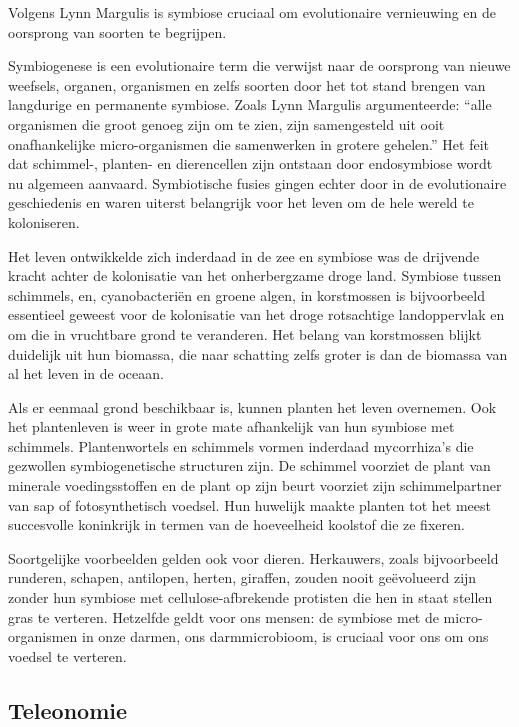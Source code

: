 \documentclass[
  11pt,
]{book}
\begin{document}
Volgens Lynn Margulis is symbiose cruciaal om evolutionaire vernieuwing en de oorsprong van soorten te begrijpen.

Symbiogenese is een evolutionaire term die verwijst naar de oorsprong van nieuwe weefsels, organen, organismen en zelfs soorten door het tot stand brengen van langdurige en permanente symbiose. Zoals Lynn Margulis argumenteerde: ``alle organismen die groot genoeg zijn om te zien, zijn samengesteld uit ooit onafhankelijke micro-organismen die samenwerken in grotere gehelen.'' Het feit dat schimmel-, planten- en dierencellen zijn ontstaan door endosymbiose wordt nu algemeen aanvaard. Symbiotische fusies gingen echter door in de evolutionaire geschiedenis en waren uiterst belangrijk voor het leven om de hele wereld te koloniseren.

Het leven ontwikkelde zich inderdaad in de zee en symbiose was de drijvende kracht achter de kolonisatie van het onherbergzame droge land. Symbiose tussen schimmels, en, cyanobacteriën en groene algen, in korstmossen is bijvoorbeeld essentieel geweest voor de kolonisatie van het droge rotsachtige landoppervlak en om die in vruchtbare grond te veranderen. Het belang van korstmossen blijkt duidelijk uit hun biomassa, die naar schatting zelfs groter is dan de biomassa van al het leven in de oceaan.

Als er eenmaal grond beschikbaar is, kunnen planten het leven overnemen. Ook het plantenleven is weer in grote mate afhankelijk van hun symbiose met schimmels. Plantenwortels en schimmels vormen inderdaad mycorrhiza's die gezwollen symbiogenetische structuren zijn. De schimmel voorziet de plant van minerale voedingsstoffen en de plant op zijn beurt voorziet zijn schimmelpartner van sap of fotosynthetisch voedsel. Hun huwelijk maakte planten tot het meest succesvolle koninkrijk in termen van de hoeveelheid koolstof die ze fixeren.

Soortgelijke voorbeelden gelden ook voor dieren. Herkauwers, zoals bijvoorbeeld runderen, schapen, antilopen, herten, giraffen, zouden nooit geëvolueerd zijn zonder hun symbiose met cellulose-afbrekende protisten die hen in staat stellen gras te verteren. Hetzelfde geldt voor ons mensen: de symbiose met de micro-organismen in onze darmen, ons darmmicrobioom, is cruciaal voor ons om ons voedsel te verteren.

\hypertarget{teleonomie}{%
\subsection{Teleonomie}\label{teleonomie}}
\end{document}
